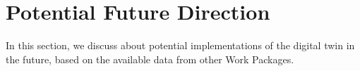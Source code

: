 \section{Potential Future Direction}

In this section, we discuss about potential implementations of the digital twin in the future, based on the available data from other Work Packages. 